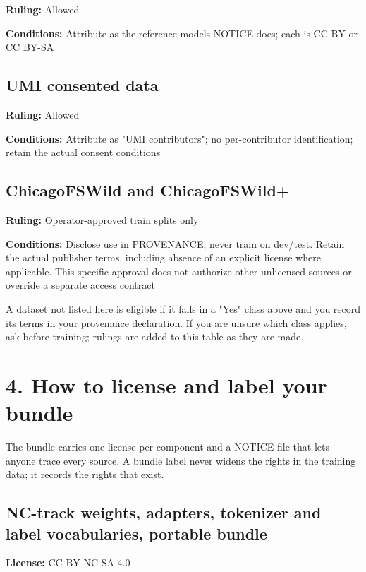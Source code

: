 \documentclass[10pt,a4paper]{article}
\begin{document}
\textbf{Ruling:} Allowed

\textbf{Conditions:} Attribute as the reference model\textquotesingle s
NOTICE does; each is CC BY or CC BY-SA

\subsection{UMI consented data}\label{umi-consented-data}

\textbf{Ruling:} Allowed

\textbf{Conditions:} Attribute as "UMI contributors"; no per-contributor
identification; retain the actual consent conditions

\subsection{ChicagoFSWild and
ChicagoFSWild+}\label{chicagofswild-and-chicagofswild}

\textbf{Ruling:} Operator-approved train splits only

\textbf{Conditions:} Disclose use in PROVENANCE; never train on
dev/test. Retain the actual publisher terms, including absence of an
explicit license where applicable. This specific approval does not
authorize other unlicensed sources or override a separate access
contract

A dataset not listed here is eligible if it falls in a "Yes" class above
and you record its terms in your provenance declaration. If you are
unsure which class applies, ask before training; rulings are added to
this table as they are made.

\section{4. How to license and label your
bundle}\label{4-how-to-license-and-label-your-bundle}

The bundle carries one license per component and a NOTICE file that lets
anyone trace every source. A bundle label never widens the rights in the
training data; it records the rights that exist.

\subsection{NC-track weights, adapters, tokenizer and label
vocabularies, portable
bundle}\label{nc-track-weights-adapters-tokenizer-and-label-vocabularies-portable-bundle}

\textbf{License:} CC BY-NC-SA 4.0
\end{document}
